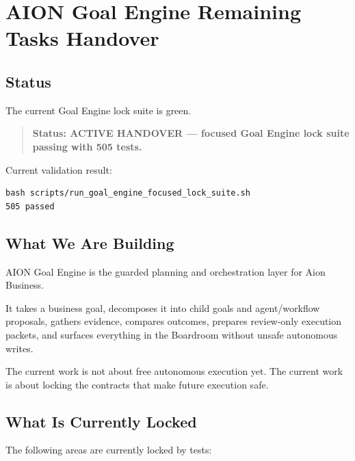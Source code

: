 \section{AION Goal Engine Remaining Tasks Handover}
\label{sec:aion-goal-engine-remaining-tasks-handover}

\subsection{Status}

The current Goal Engine lock suite is green.

\begin{quote}
\textbf{Status: ACTIVE HANDOVER --- focused Goal Engine lock suite passing with 505 tests.}
\end{quote}

Current validation result:

\begin{verbatim}
bash scripts/run_goal_engine_focused_lock_suite.sh
505 passed
\end{verbatim}

\subsection{What We Are Building}

AION Goal Engine is the guarded planning and orchestration layer for Aion Business.

It takes a business goal, decomposes it into child goals and agent/workflow proposals, gathers evidence, compares outcomes, prepares review-only execution packets, and surfaces everything in the Boardroom without unsafe autonomous writes.

The current work is not about free autonomous execution yet. The current work is about locking the contracts that make future execution safe.

\subsection{What Is Currently Locked}

The following areas are currently locked by tests:

